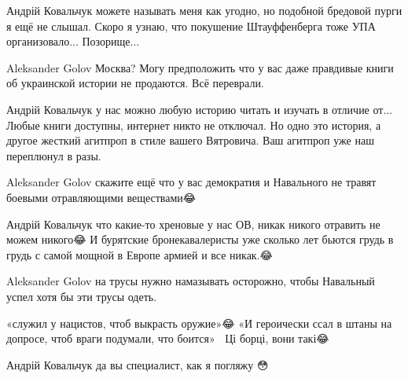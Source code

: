  
 
 
 
 
\begin{itemize}


Андрій Ковальчук можете называть меня как угодно, но подобной бредовой пурги я
ещё не слышал. Скоро я узнаю, что покушение Штауффенберга тоже УПА
организовало...  Позорище...


Aleksander Golov Москва? Могу предположить что у вас даже правдивые книги об
украинской истории не продаются. Всё переврали.


Андрій Ковальчук у нас можно любую историю читать и изучать в отличие от...
Любые книги доступны, интернет никто не отключал. Но одно это история, а другое
жесткий агитпроп в стиле вашего Вятровича.  Ваш агитпроп уже наш переплюнул в
разы.


Aleksander Golov скажите ещё что у вас демократия и Навального не травят боевыми отравляющими веществами😂


Андрій Ковальчук что какие-то хреновые у нас ОВ, никак никого отравить не можем никого😂
И бурятские бронекавалеристы уже сколько лет бьются грудь в грудь с самой мощной в Европе армией и все никак.😂


Aleksander Golov на трусы нужно намазывать осторожно, чтобы Навальный успел хотя бы эти трусы одеть.


«служил у нацистов, чтоб выкрасть оружие»😂
«И героически ссал в штаны на допросе, чтоб враги подумали, что боится»💪🏻
Ці борці, вони такі😂


Андрій Ковальчук да вы специалист, как я погляжу 😳



\end{itemize}
